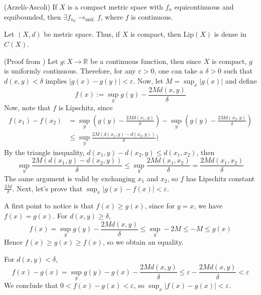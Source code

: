 \begin{theorem}(Arzelà-Ascoli)
	If $X$ is a compact metric space with $f_n$ equicontinuous and
	equibounded, then $\exists f_{n_k}\to_{\text{unif.}}f$, where
	$f$ is continuous.
	\label{thm:arzela-ascoli}
\end{theorem}

\begin{theorem}
	Let $(X,d)$ be metric space. Thus, if $X$ is compact, then $\mathrm{Lip}(X)$ is dense in $C(X)$.
	\label{thm:lipdense}
\end{theorem}
\begin{prf} (Proof from \citet{stackoverflow1})
	Let $g:X\to \mathbb R$ be a continuous function, then
	since $X$ is compact, $g$ is uniformly continuous.
	Therefore, for any $\varepsilon>0$, one can take a
	$\delta >0$ such that $d(x,y) < \delta$ implies
	$|g(x)-g(y)|<\varepsilon$. Now, let $M = \sup_{x}|g(x)|$
	and define
	\begin{equation*}
		f(x) :=
		\sup_y g(y) - \frac{2Md(x,y)}{\delta}
	\end{equation*}
	Now, note that $f$ is Lipschitz, since
	\begin{align*}
		f(x_1) - f(x_2) &= 
		\sup_y \left(g(y) - \frac{2Md(x_1,y)}{\delta}\right) -
		\sup_y \left(g(y) - \frac{2Md(x_2,y)}{\delta} \right)\\
		&\leq
		\sup_y \frac{2M(d(x_1,y)-d(x_2,y))}{\delta})
	\end{align*}
	By the triangle inequality, $d(x_1,y) - d(x_2,y) \leq d(x_1,x_2)$, then
	\begin{equation*}
		\sup_y \frac{2M(d(x_1,y)-d(x_2,y))}{\delta} \leq 
		\sup_y \frac{2Md(x_1,x_2)}{\delta} = 
		\frac{2Md(x_1,x_2)}{\delta}
	\end{equation*}
	The same argument is valid by exchanging $x_1$ and $x_2$, so $f$ has Lipschitz constant
	$\frac{2M}{\delta}$. Next, let's prove that $\sup_x |g(x) - f(x)| < \varepsilon$.

	A first point to notice is that $f(x)\geq g(x)$, since for $y=x$, we have $f(x) = g(x)$.
	For $d(x,y) \geq \delta$,
	\begin{equation*}
		f(x) = \sup_y g(y) - \frac{2M d(x,y)}{\delta}\leq \sup_y - 2M \leq -M \leq g(x)
	\end{equation*}
	Hence $f(x)\geq g(x) \geq f(x)$, so we obtain an equality.

	For $d(x,y) < \delta$,
	\begin{equation*}
		f(x) - g(x) = \sup_y g(y) - g(x) - \frac{2M d(x,y)}{\delta}
		\leq \varepsilon -\frac{2M d(x,y)}{\delta} < \varepsilon
	\end{equation*}
	We conclude that $0< f(x) - g(x) < \varepsilon$, so $\sup_x|f(x)-g(x)|< \varepsilon$.

\end{prf}


